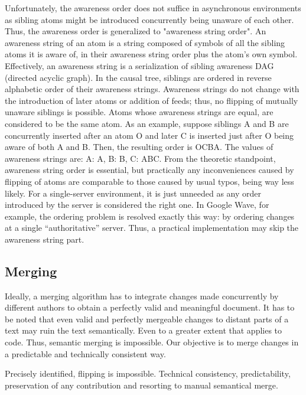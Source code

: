 \documentclass[twocolumn]{article}
\begin{document}
   Unfortunately, the awareness order does not suffice in asynchronous
   environments as sibling atoms might be introduced concurrently
   being unaware of each other. Thus, the awareness order is
   generalized to "awareness string order". An awareness string of an
   atom is a string composed of symbols of all the sibling atoms it is
   aware of, in their awareness string order plus the atom's own symbol.
   Effectively, an awareness string is a serialization of sibling
   awareness DAG (directed acyclic graph). In the causal tree,
   siblings are ordered in reverse alphabetic order of their awareness
   strings. Awareness strings do not change with the introduction of
   later atoms or addition of feeds; thus, no flipping of mutually
   unaware siblings is possible. Atoms whose awareness strings are
   equal, are considered to be the same atom.
   As an example, suppose siblings A and B are concurrently inserted
   after an atom O and later C is inserted just after O being aware of
   both A and B. Then, the resulting order is OCBA. The values of
   awareness strings are:
     A:    A,
     B:    B,
     C:    ABC.
   From the theoretic standpoint, awareness string order is essential,
   but practically any inconveniences caused by flipping of atoms are
   comparable to those caused by usual typos, being way less likely.
   For a single-server environment, it is just unneeded as any order
   introduced by the server is considered the right one. In
   Google Wave, for example, the ordering problem is resolved exactly
   this way: by ordering changes at a single ``authoritative'' server.
   Thus, a practical implementation may skip the awareness string part.
   
\subsection {Merging}
  Ideally, a merging algorithm has to integrate changes made concurrently
  by different authors to obtain a perfectly valid and meaningful
  document.
  It has to be noted that even valid and perfectly mergeable changes to
  distant parts of a text may ruin the text semantically. Even to a 
  greater extent that applies to code. Thus, semantic merging is
  impossible. Our objective is to merge changes in a predictable and
  technically consistent way.
  
  Precisely identified, flipping is impossible.
  Technical consistency, predictability,
   preservation of any contribution and resorting
  to manual semantical merge.
  
\end{document}
